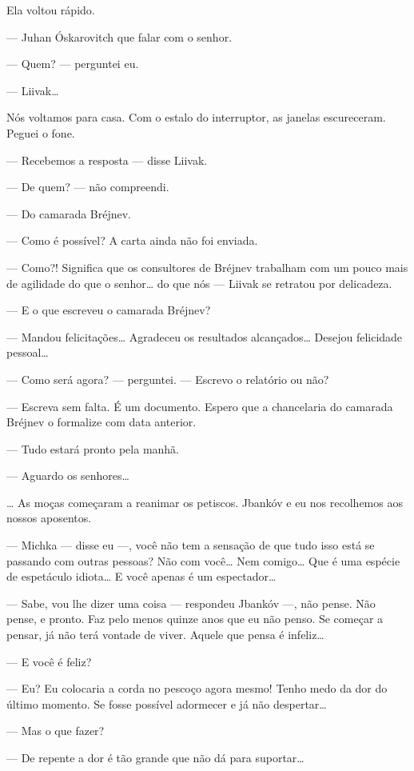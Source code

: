 Ela voltou rápido.

--- Juhan Óskarovitch que falar com o senhor.

--- Quem? --- perguntei eu.

--- Liivak\ldots{}

Nós voltamos para casa. Com o estalo do interruptor, as janelas
escureceram. Peguei o fone.

--- Recebemos a resposta --- disse Liivak.

--- De quem? --- não compreendi.

--- Do camarada Bréjnev.

--- Como é possível? A carta ainda não foi enviada.

--- Como?! Significa que os consultores de Bréjnev trabalham com
um pouco mais de agilidade do que o senhor\ldots{} do que nós ---
Liivak se retratou por delicadeza.

--- E o que escreveu o camarada Bréjnev?

--- Mandou felicitações\ldots{} Agradeceu os resultados alcançados\ldots{}
Desejou felicidade pessoal\ldots{}

--- Como será agora? --- perguntei. --- Escrevo o
relatório ou não?

--- Escreva sem falta. É um documento. Espero que a chancelaria
do camarada Bréjnev o formalize com data anterior.

--- Tudo estará pronto pela manhã.

--- Aguardo os senhores\ldots{}

\ldots{} As moças começaram a reanimar os petiscos. Jbankóv e eu nos
recolhemos aos nossos aposentos.

--- Michka --- disse eu ---, você não tem a sensação
de que tudo isso está se passando com outras pessoas? Não com você\ldots{}
Nem comigo\ldots{} Que é uma espécie de espetáculo idiota\ldots{} E você apenas é
um espectador\ldots{}

--- Sabe, vou lhe dizer uma coisa --- respondeu Jbankóv
---, não pense. Não pense, e pronto. Faz pelo menos quinze anos
que eu não penso. Se começar a pensar, já não terá vontade de viver.
Aquele que pensa é infeliz\ldots{}

--- E você é feliz?

--- Eu? Eu colocaria a corda no pescoço agora mesmo! Tenho medo \label{ref01}
da dor do último momento. Se fosse possível adormecer e já não
despertar\ldots{}

--- Mas o que fazer?

--- De repente a dor é tão grande que não dá para suportar\ldots{}

